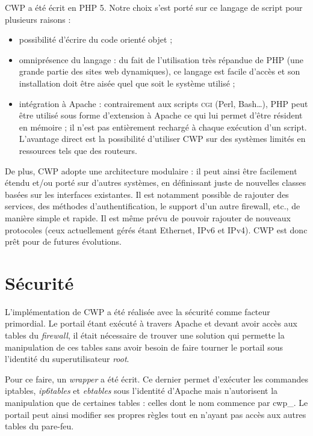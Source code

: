 \documentclass[a4paper,11pt]{report}
\newcommand{\ensp}[1]{\selectlanguage{english}#1\selectlanguage{french}}
\newcommand{\func}[1]{\ensp{\textsf{#1}}}
\newcommand{\cwp}{%
  CWP%
}
\begin{document}
\cwp{} a été écrit en PHP 5. Notre choix s'est porté sur ce langage de script
pour plusieurs raisons :
\begin{itemize}
  \item possibilité d'écrire du code orienté objet ;
  \item omniprésence du langage : du fait de l'utilisation très répandue de
        PHP (une grande partie des sites web dynamiques), ce langage est
        facile d'accès et son installation doit être aisée quel que soit le
        système utilisé ;
  \item intégration à Apache : contrairement aux scripts \textsc{cgi} (Perl,
        Bash\dots), PHP peut être utilisé sous forme d'extension à Apache ce
        qui lui permet d'être résident en mémoire ; il n'est pas entièrement
        rechargé à chaque exécution d'un script. L'avantage direct est la
        possibilité d'utiliser \cwp{} sur des systèmes limités en ressources
        tels que des routeurs.
\end{itemize}\medskip

De plus, \cwp{} adopte une architecture modulaire : il peut ainsi être
facilement étendu et/ou porté sur d'autres systèmes, en définissant juste
de nouvelles classes basées sur les interfaces existantes. Il est notamment
possible de rajouter des services, des méthodes d'authentification, le support
d'un autre firewall, etc., de manière simple et rapide. Il est même prévu de
pouvoir rajouter de nouveaux protocoles (ceux actuellement gérés étant
Ethernet, IPv6 et IPv4). \cwp{} est donc prêt pour de futures évolutions.

\section{Sécurité}

L'implémentation de \cwp{} a été réalisée avec la sécurité comme facteur
primordial. Le portail étant exécuté à travers Apache et devant avoir accès
aux tables du \emph{firewall}, il était nécessaire de trouver une solution qui
permette la manipulation de ces tables sans avoir besoin de faire tourner le
portail sous l'identité du superutilisateur \emph{root}.

Pour ce faire, un \emph{wrapper} a été écrit. Ce dernier permet d'exécuter les
commandes \func{iptables}, \emph{ip6tables} et \emph{ebtables} sous l'identité
d'Apache mais n'autorisent la manipulation que de certaines tables : celles
dont le nom commence par \og cwp\_\fg. Le portail peut ainsi modifier ses
propres règles tout en n'ayant pas accès aux autres tables du pare-feu.
\end{document}
